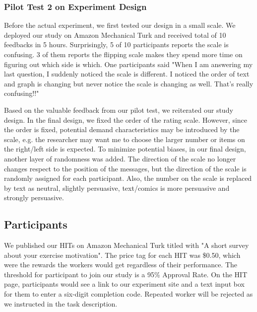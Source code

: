 \subsubsection{Pilot Test 2 on Experiment Design}
Before the actual experiment, we first tested our design in a small scale. We deployed our study on Amazon Mechanical Turk and received total of 10 feedbacks in 5 hours. Surprisingly, 5 of 10 participants reports the scale is confusing. 3 of them reports the flipping scale makes they spend more time on figuring out which side is which. One participants said "When I am answering my last question, I suddenly noticed the scale is different. I noticed the order of text and graph is changing but never notice the scale is changing as well. That's really confusing!!"\par
Based on the valuable feedback from our pilot test, we reiterated our study design. In the final design, we fixed the order of the rating scale. However, since the order is fixed, potential demand characteristics may be introduced by the scale, e.g. the researcher may want me to choose the larger number or items on the right/left side is expected. To minimize potential biases, in our final design, another layer of randomness was added.  The direction of the scale no longer changes respect to the position of the messages, but the direction of the scale is randomly assigned for each participant. Also, the number on the scale is replaced by text as neutral, slightly persuasive, text/comics is more persuasive and strongly persuasive.
\subsection{Participants}
We published our HITs on Amazon Mechanical Turk titled with "A short survey about your exercise motivation". The price tag for each HIT was \$0.50, which were the rewards the workers would get regardless of their performance. The threshold for participant to join our study is a 95\% Approval Rate. On the HIT page, participants would see a link to our experiment site and a text input box for them to enter a six-digit completion code. Repeated worker will be rejected as we instructed in the task description.
